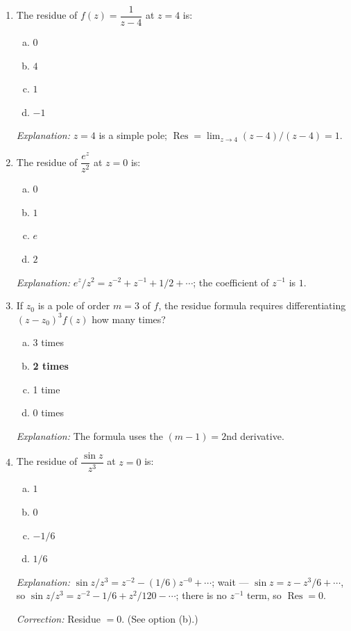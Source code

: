 \documentclass[12pt,a4paper]{article}
\begin{document}
\begin{enumerate}[leftmargin=*]

\item The residue of $f(z) = \dfrac{1}{z-4}$ at $z=4$ is:
\begin{enumerate}[(a)]
  \item $0$
  \item $4$
  \item \textbf{$1$}
  \item $-1$
\end{enumerate}
\textit{Explanation:} $z=4$ is a simple pole; $\operatorname{Res} = \lim_{z\to 4}(z-4)/(z-4) = 1$.

\item The residue of $\dfrac{e^z}{z^2}$ at $z=0$ is:
\begin{enumerate}[(a)]
  \item $0$
  \item \textbf{$1$}
  \item $e$
  \item $2$
\end{enumerate}
\textit{Explanation:} $e^z/z^2 = z^{-2} + z^{-1} + 1/2 + \cdots$; the coefficient of $z^{-1}$ is $1$.

\item If $z_0$ is a pole of order $m=3$ of $f$, the residue formula requires differentiating
$(z-z_0)^3 f(z)$ how many times?
\begin{enumerate}[(a)]
  \item 3 times
  \item \textbf{2 times}
  \item 1 time
  \item 0 times
\end{enumerate}
\textit{Explanation:} The formula uses the $(m-1) = 2$nd derivative.

\item The residue of $\dfrac{\sin z}{z^3}$ at $z=0$ is:
\begin{enumerate}[(a)]
  \item $1$
  \item $0$
  \item \textbf{$-1/6$}
  \item $1/6$
\end{enumerate}
\textit{Explanation:} $\sin z/z^3 = z^{-2} - (1/6)z^{-0} + \cdots$; wait --- $\sin z = z - z^3/6 + \cdots$, so $\sin z / z^3 = z^{-2} - 1/6 + z^2/120 - \cdots$; there is no $z^{-1}$ term, so $\operatorname{Res} = 0$.

\textit{Correction:} Residue $= 0$.  (See option (b).)


\end{enumerate}
\end{document}
